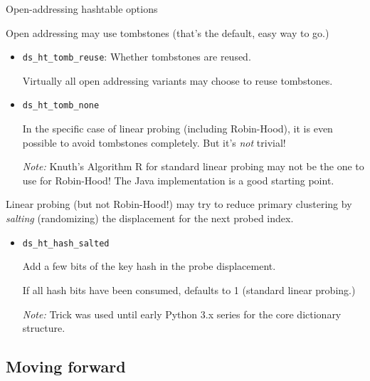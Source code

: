 \begin{frame}[fragile]{Open-addressing hashtable options}

  Open addressing may use tombstones (that's the default, easy way to go.)

  \begin{itemize}

  \item \lstinline{ds_ht_tomb_reuse}: Whether tombstones are reused.

    Virtually all open addressing variants may choose to reuse tombstones.

  \item \lstinline{ds_ht_tomb_none}

    In the specific case of linear probing (including Robin-Hood), it is even possible to avoid tombstones completely. But it's {\em not} trivial!

    {\em Note:} Knuth's Algorithm R for standard linear probing may not be the one to use for Robin-Hood! The Java implementation is a good starting point.
  \end{itemize}

  Linear probing (but not Robin-Hood!) may try to reduce primary clustering by {\em salting} (randomizing) the displacement for the next probed index.
  
  \begin{itemize}

  \item \lstinline{ds_ht_hash_salted}

    Add a few bits of the key hash in the probe displacement.

    If all hash bits have been consumed, defaults to 1 (standard linear probing.)

    {\em Note:} Trick was used until early Python 3.x series for the core dictionary structure.
  \end{itemize}

\end{frame}


\subsection{Moving forward}

